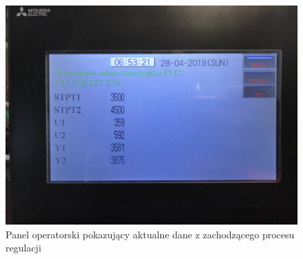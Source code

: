 \begin{figure}[H]
\setlength{\leftskip}{-0.2cm}
\includegraphics[scale=0.09]{../data/lab/thermal_object/zad5/IMG_0966.JPG}
\caption{Panel operatorski pokazujący aktualne dane z zachodzącego procesu regulacji}
\end{figure}
